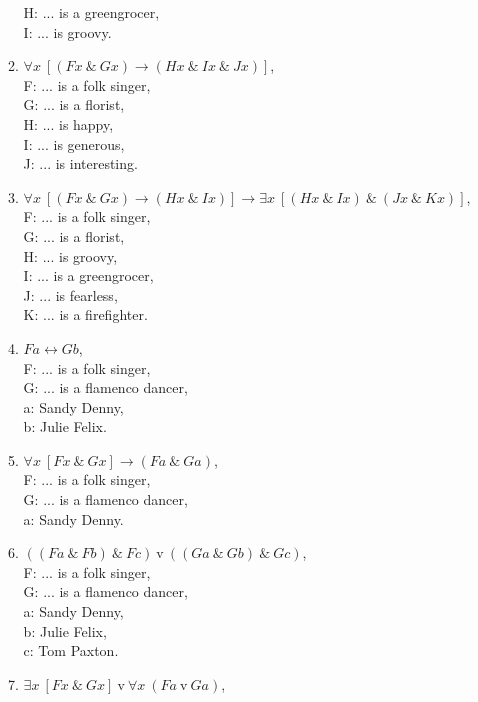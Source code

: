 \documentclass[a4paper,12pt]{article}
\newcommand{\ra}{\rightarrow}
\newcommand{\lra}{\leftrightarrow}
\newcommand{\tv}{ \ \textrm{v} \ }
\newcommand{\ta}{ \ \& \ }
\newcommand{\all}{\forall}
\newcommand{\ex}{\exists}
\begin{document}
\begin{enumerate}[label=\arabic*,leftmargin=*]
\begin{enumerate}[label=(\roman*),leftmargin=*]
                    H: ... is a greengrocer,\\
                    I: ... is groovy.
                \item $\all x \ [(Fx \ta Gx) \ra (Hx \ta Ix \ta Jx)]$,\\
                    F: ... is a folk singer,\\
                    G: ... is a florist,\\
                    H: ... is happy,\\
                    I: ... is generous,\\
                    J: ... is interesting.
                \item $\all x \ [(Fx \ta Gx) \ra (Hx \ta Ix)] \ra \ex x \ [(Hx \ta Ix) \ta (Jx \ta Kx)]$,\\
                    F: ... is a folk singer,\\
                    G: ... is a florist,\\
                    H: ... is groovy,\\
                    I: ... is a greengrocer,\\
                    J: ... is fearless,\\
                    K: ... is a firefighter.
                \item $Fa \lra Gb$,\\
                    F: ... is a folk singer,\\
                    G: ... is a flamenco dancer,\\
                    a: Sandy Denny,\\
                    b: Julie Felix.
                \item $\all x \ [Fx \ta Gx] \ra (Fa \ta Ga)$,\\
                    F: ... is a folk singer,\\
                    G: ... is a flamenco dancer,\\
                    a: Sandy Denny.
                \item $((Fa \ta Fb) \ta Fc) \tv ((Ga \ta Gb) \ta Gc)$,\\
                    F: ... is a folk singer,\\
                    G: ... is a flamenco dancer,\\
                    a: Sandy Denny,\\
                    b: Julie Felix,\\
                    c: Tom Paxton.
                \item $\ex x \ [Fx \ta Gx] \tv \all x \ (Fa \tv Ga)$,\\

\end{enumerate}
\end{enumerate}
\end{document}
